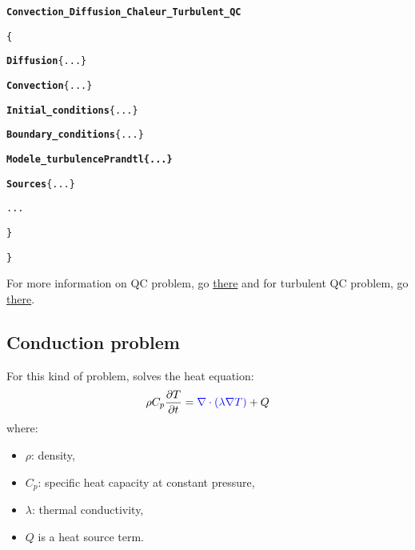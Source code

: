 \begin{center}
{\begin{minipage}[c]{0.95\textwidth}
\begin{alltt}
\hspace{1cm}    {\bf{Convection\_Diffusion\_Chaleur}\textcolor{Greeen}{\_Turbulent}\_QC}

\hspace{1cm}    \{

\hspace{2cm}        {\bf{Diffusion}} \{ ... \}

\hspace{2cm}        {\bf{Convection}} \{ ... \}

\hspace{2cm}        {\bf{Initial\_conditions}} \{ ... \}

\hspace{2cm}        {\bf{Boundary\_conditions}} \{ ... \}

\hspace{2cm}        {\bf{\textcolor{Greeen}{Modele\_turbulence Prandtl \{ ... \} } }}

\hspace{2cm}        {\bf{Sources}} \{ ... \}

\hspace{2cm}        ...

\hspace{1cm}    \}

\}
\end{alltt}
\end{minipage}}
\end{center}

For more information on QC problem, go \href{\REFERENCEMANUAL\#pbthermohydrauliqueqc}{there} and for turbulent QC problem, go \href{\REFERENCEMANUAL\#pbthermohydrauliqueturbulentqc}{there}.



\subsection{Conduction problem}
For this kind of problem, \trust solves the heat equation:
$$
\rho C_p \frac{\partial T}{\partial t} = \textcolor{blue}{\nabla \cdot \left(\lambda \nabla T\right)} + Q
$$
where:
\begin{itemize}
\item $\rho$: density,
\item $C_p$: specific heat capacity at constant pressure,
\item $\lambda$: thermal conductivity,
\item $Q$ is a heat source term.
\end{itemize}

